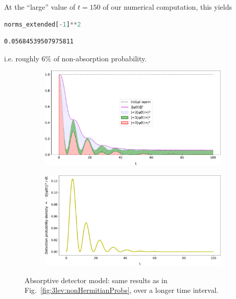 At the ``large'' value of $t=150$ of our numerical computation, this yields
\begin{lstlisting}[language=Python]
norms_extended[-1]**2
\end{lstlisting}
\begin{lstlisting}
0.05684539507975811
\end{lstlisting}
i.e. roughly 6\% of non-absorption probability.
%
\begin{figure}[]
  \begin{subfigure}[b]{\textwidth}
    \centering
    \includegraphics[width=\textwidth]{img/3ldetect/loss3color_ext_cut.pdf}
    \label{fig:3lev:loss3color_ext}
  \end{subfigure}
  \par\bigskip
  \par\bigskip
  \begin{subfigure}[b]{\textwidth}
    \centering
    \includegraphics[width=\textwidth]{img/3ldetect/loss_ext_cut.pdf}
    \label{fig:3lev:loss_ext}
  \end{subfigure}
  \par\bigskip
  \par\bigskip
  \caption[
    Absorptive detector model: evolution over a longer time interval.
  ]{
    Absorptive detector model: same results as in Fig.~\ref{fig:3lev:nonHermitianProbs},
    over a longer time interval.
  }
  \label{fig:3lev:nonHermitianProbs_ext}
\end{figure}

